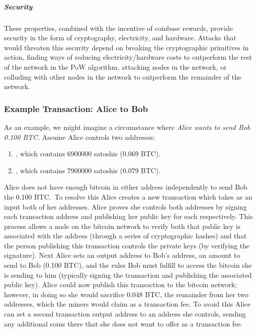 \subparagraph{Security}
These properties, combined with the incentive of coinbase rewards, provide
security in the form of cryptography, electricity, and hardware. Attacks that
would threaten this security depend on breaking the cryptographic primitives in
action, finding ways of reducing electricity/hardware costs to outperform the
rest of the network in the PoW algorithm, attacking nodes in the network, or
colluding with other nodes in the network to outperform the remainder of the
network.

\subsubsection{Example Transaction: Alice to Bob}

As an example, we might imagine a circumstance where \emph{Alice wants to send
Bob 0.100 BTC.} Assume Alice controls two addresses:

\begin{enumerate}
  \item {}, which contains 6900000
    satoshis (0.069 BTC).
  \item {}, which contains 7900000
    satoshis (0.079 BTC).
\end{enumerate}

Alice does not have enough bitcoin in either address independently to send Bob
the 0.100 BTC.\ To resolve this Alice creates a new transaction which takes as
an input both of her addresses. Alice proves she controls both addresses by
signing each transaction address and publishing her public key for each
respectively. This process allows a node on the bitcoin network to verify both
that public key is associated with the address (through a series of
cryptographic hashes) and that the person publishing this transaction controls
the private keys (by verifying the signature). Next Alice sets an output address
to Bob's address, an amount to send to Bob (0.100 BTC), and the rules Bob must
fulfill to access the bitcoin she is sending to him (typically signing the
transaction and publishing the associated public key). Alice could now publish
this transaction to the bitcoin network; however, in doing so she would
sacrifice 0.048 BTC, the remainder from her two addresses, which the miners
would claim as a transaction fee. To avoid this Alice can set a second
transaction output address to an address she controls, sending any additional
coins there that she does not want to offer as a transaction fee.
